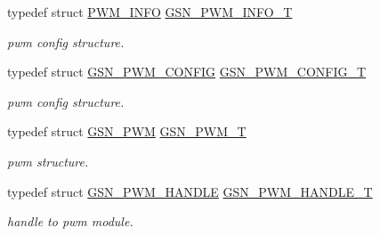 \begin{DoxyCompactItemize}
typedef struct \hyperlink{a00454}{PWM\_\-INFO} \hyperlink{a00650_gaf27034c3354002d4d9ab5141852aea8a}{GSN\_\-PWM\_\-INFO\_\-T}
\begin{DoxyCompactList}\small\item\em pwm config structure. \end{DoxyCompactList}\item 
typedef struct \hyperlink{a00181}{GSN\_\-PWM\_\-CONFIG} \hyperlink{a00650_ga635ed55bc6092da2e511379b0b6f6c64}{GSN\_\-PWM\_\-CONFIG\_\-T}
\begin{DoxyCompactList}\small\item\em pwm config structure. \end{DoxyCompactList}\item 
typedef struct \hyperlink{a00180}{GSN\_\-PWM} \hyperlink{a00650_gad6886352df79f09ac5070d71f1117f7f}{GSN\_\-PWM\_\-T}
\begin{DoxyCompactList}\small\item\em pwm structure. \end{DoxyCompactList}\item 
typedef struct \hyperlink{a00182}{GSN\_\-PWM\_\-HANDLE} \hyperlink{a00650_ga8be9b48972007ba1d54815d6743d13e6}{GSN\_\-PWM\_\-HANDLE\_\-T}
\begin{DoxyCompactList}\small\item\em handle to pwm module. \end{DoxyCompactList}\end{DoxyCompactItemize}
